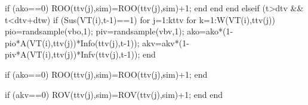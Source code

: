                                                                             if (ako==0)
                                                                                    ROO(ttv(j),sim)=ROO(ttv(j),sim)+1;
                                                                            end                                                                           
                                                                    end                                                                           
                                                            end
                                          elseif (t>dtv && t<dtv+dtw)
                                                            if (Sus(VT(i),t-1)==1)
                                                                    for j=1:kttv                                                                                                  
                                                                            for k=1:W(VT(i),ttv(j))                                                                                                                                                                                                           
                                                                                pio=randsample(vbo,1);
                                                                                piv=randsample(vbv,1);                                    
                                                                                ako=ako*(1-pio*A(VT(i),ttv(j))*Info(ttv(j),t-1));
                                                                                akv=akv*(1-piv*A(VT(i),ttv(j))*Infv(ttv(j),t-1));                                                                                                                        
                                                                            end
                                                          
                                                                            if (ako==0)
                                                                                    ROO(ttv(j),sim)=ROO(ttv(j),sim)+1;
                                                                            end
                                                          
                                                                            if (akv==0)
                                                                                    ROV(ttv(j),sim)=ROV(ttv(j),sim)+1;
                                                                            end                                                             
                                                                    end
                                                     
